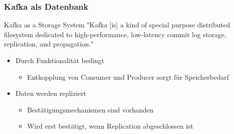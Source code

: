 %

\begin{frame}
\frametitle{Kafka als Datenbank}

\begin{block}{Kafka as a Storage System}
	"Kafka [is] a kind of special purpose distributed filesystem dedicated to high-performance, low-latency commit log storage, replication, and propagation." \cite{Kafka}
\end{block}


\begin{itemize}
	\item Durch Funktionalität bedingt
	\begin{itemize}
		\item Entkopplung  von Consumer und Producer sorgt für Speicherbedarf
	\end{itemize}
	\item Daten werden repliziert
	\begin{itemize}
		\item Bestätigungsmechanismen sind vorhanden
		\item Wird erst bestätigt, wenn Replication abgeschlossen ist
	\end{itemize}
\end{itemize}

\end{frame}



